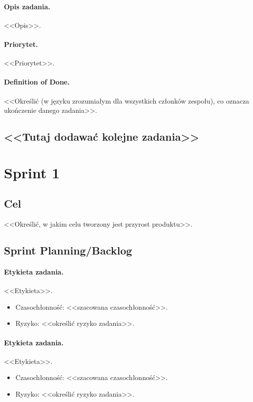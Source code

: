\documentclass[a4paper]{amsart}
\begin{document}
\paragraph{Opis zadania.} <<Opis>>.
\paragraph{Priorytet.} <<Priorytet>>.
\paragraph{Definition of Done.} <<Określić (w języku zrozumiałym dla wszystkich członków zespołu), co oznacza ukończenie danego zadania>>.

\subsection*{<<Tutaj dodawać kolejne zadania>>}

\section{Sprint 1}
\subsection{Cel} <<Określić, w jakim celu tworzony jest przyrost produktu>>.
\subsection{Sprint Planning/Backlog}

\paragraph{Etykieta zadania.} <<Etykieta>>.
\begin{itemize}
\item Czasochłonność: <<szacowana czasochłonność>>.
\item{Ryzyko:} <<określić ryzyko zadania>>.
\end{itemize}

\paragraph{Etykieta zadania.} <<Etykieta>>.
\begin{itemize}
\item Czasochłonność: <<szacowana czasochłonność>>.
\item{Ryzyko:} <<określić ryzyko zadania>>.
\end{itemize}
\end{document}
